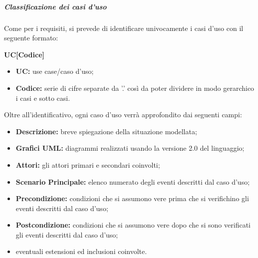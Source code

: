 \documentclass[]{article}
\begin{document}
						\subparagraph{Classificazione dei casi d'uso}
						Come per i requisiti, si prevede di identificare univocamente i casi d'uso con il seguente formato:
						\begin{center}
							\textbf{UC[Codice]}
						\end{center}
						\begin{itemize}
							\item \textbf{UC:} use case/caso d'uso;
							\item \textbf{Codice:} serie di cifre separate da ’.’ così da poter dividere in modo gerarchico i casi e sotto casi.
						\end{itemize}
						Oltre all'identificativo, ogni caso d'uso verrà approfondito dai seguenti campi:
						\begin{itemize}
							\item \textbf{Descrizione:} breve spiegazione della situazione modellata;
							\item \textbf{Grafici UML:} diagrammi realizzati usando la versione 2.0 del linguaggio;
							\item \textbf{Attori:} gli attori primari e secondari coinvolti;
							\item \textbf{Scenario Principale:} elenco numerato degli eventi descritti dal caso d'uso;
							\item \textbf{Precondizione:} condizioni che si assumono vere prima che si verifichino gli eventi descritti dal caso d'uso;
							\item \textbf{Postcondizione:} condizioni che si assumono vere dopo che si sono verificati gli eventi descritti dal caso d'uso;
							\item eventuali estensioni ed inclusioni coinvolte.
						\end{itemize}
					
\end{document}

